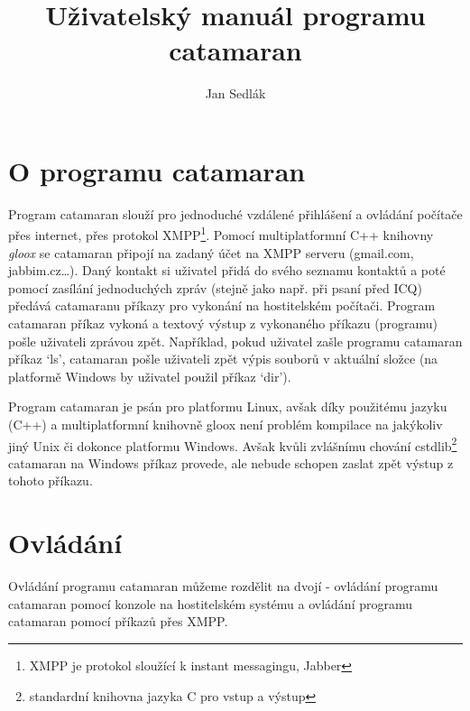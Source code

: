 \documentclass[a4paper,11pt,titlepage]{article}
\author{Jan Sedlák}
\title{Uživatelský manuál programu catamaran}
\begin{document}
\maketitle
\tableofcontents
\newpage
\section{O programu catamaran}
Program catamaran slouží pro jednoduché vzdálené přihlášení a ovládání počítače přes internet, přes protokol XMPP\footnote{XMPP je protokol sloužící k instant messagingu, Jabber}.
Pomocí multiplatformní C++ knihovny \emph{gloox} se catamaran připojí na zadaný účet na XMPP serveru (gmail.com, jabbim.cz\ldots). Daný kontakt si uživatel přidá do svého seznamu kontaktů
a poté pomocí zasílání jednoduchých zpráv (stejně jako např. při psaní před ICQ) předává catamaranu příkazy pro vykonání na hostitelském počítači. Program catamaran příkaz vykoná
a textový výstup z vykonaného příkazu (programu) pošle uživateli zprávou zpět. Například, pokud uživatel zašle programu catamaran příkaz `ls', catamaran pošle uživateli zpět výpis
souborů v aktuální složce (na platformě Windows by uživatel použil příkaz `dir').

Program catamaran je psán pro platformu Linux, avšak díky použitému jazyku (C++) a multiplatformní knihovně gloox není problém kompilace na jakýkoliv jiný Unix či dokonce platformu Windows.
Avšak kvůli zvlášnímu chování cstdlib\footnote{standardní knihovna jazyka C pro vstup a výstup} catamaran na Windows příkaz provede, ale nebude schopen zaslat zpět výstup z tohoto příkazu.
\newpage
\section{Ovládání}
Ovládání programu catamaran můžeme rozdělit na dvojí - ovládání programu catamaran pomocí konzole na hostitelském systému a ovládání programu catamaran pomocí příkazů přes XMPP.
\end{document}
